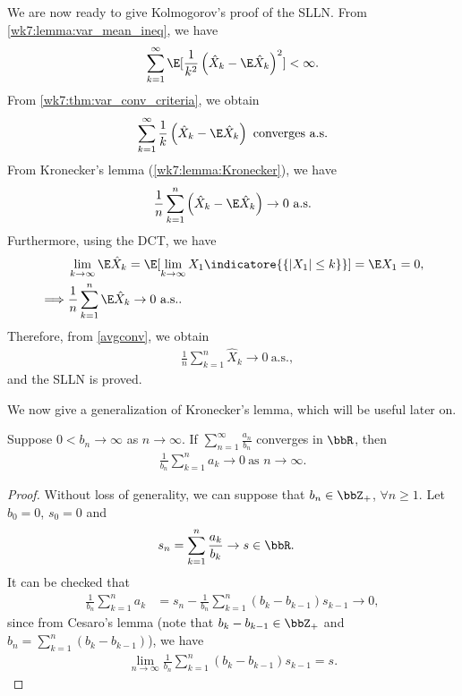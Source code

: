 \documentclass[../aipt.tex]{subfiles}
\begin{document}
We are now ready to give Kolmogorov's proof of the SLLN. From \cref{wk7:lemma:var_mean_ineq}, we have
\begin{align*}
\sum_{k = 1}^{\infty} \E[\frac{1}{k^2} \left(\hat{X}_k - \E \hat{X}_k  \right)^2] < \infty.
\end{align*}
From \cref{wk7:thm:var_conv_criteria}, we obtain
\begin{align*}
\sum_{k = 1}^{\infty} \frac{1}{k} \left(\hat{X}_k - \E \hat{X}_k  \right) \text{ converges a.s.}
\end{align*}
From Kronecker's lemma (\cref{wk7:lemma:Kronecker}), we have
\begin{align}\label{avgconv}
\frac{1}{n} \sum_{k = 1}^{n} \left(\hat{X}_k - \E \hat{X}_k  \right) \to 0 \ \text{a.s.}
\end{align}
Furthermore, using the DCT, we have
\begin{align}
&\lim_{k \to \infty} \E \hat{X}_k = \E[\lim_{k \to \infty} X_1 \indicatore{\{|X_1| \leq k\}}] = \E X_1 = 0, \\
\implies
&\frac{1}{n} \sum_{k = 1}^{n} \E \hat{X}_k \to 0 \ \text{a.s.}. \label{hatXExp}
\end{align}
Therefore, from \cref{avgconv}, we obtain 
\begin{align*}
&\frac{1}{n} \sum_{k = 1}^{n} \hat{X}_k \to 0 \ \text{a.s.},
\end{align*}
and the SLLN is proved.

We now give a generalization of Kronecker's lemma, which will be useful later on.
\begin{Lemma}\label{wk7:Generalized_Kronecker}
Suppose $0< b_n \to \infty$ as $n\to\infty$. If $\displaystyle\sum_{n=1}^{\infty} \frac{a_n}{b_n}$ converges in $\bbR$, then
\begin{align*}
\frac{1}{b_n} \sum_{k=1}^n a_k \to 0 \ \text{as $n \to \infty$}.
\end{align*}
\end{Lemma}
%
\begin{proof}
Without loss of generality, we can suppose that $b_n \in \bbZ_+$, $\forall n\geq1$. Let $b_0 = 0$, $s_0 = 0$ and
\begin{align*}
s_n &= \sum_{k=1}^n \frac{a_k}{b_k} \to s \in \bbR.
\end{align*}
It can be checked that
\begin{align*}
\frac{1}{b_n} \sum_{k=1}^n a_k 
&= s_n - \frac{1}{b_n} \sum_{k=1}^n (b_k - b_{k-1}) s_{k-1} \to 0,
\end{align*}
since from Cesaro's lemma (note that $b_k - b_{k-1} \in \bbZ_+$ and $b_n=\sum_{k=1}^n (b_k - b_{k-1})$), we have
\begin{align*}
\lim_{n \to \infty} \frac{1}{b_n} \sum_{k=1}^n (b_k - b_{k-1}) s_{k-1} = s.
\end{align*}
\end{proof}
\end{document}
